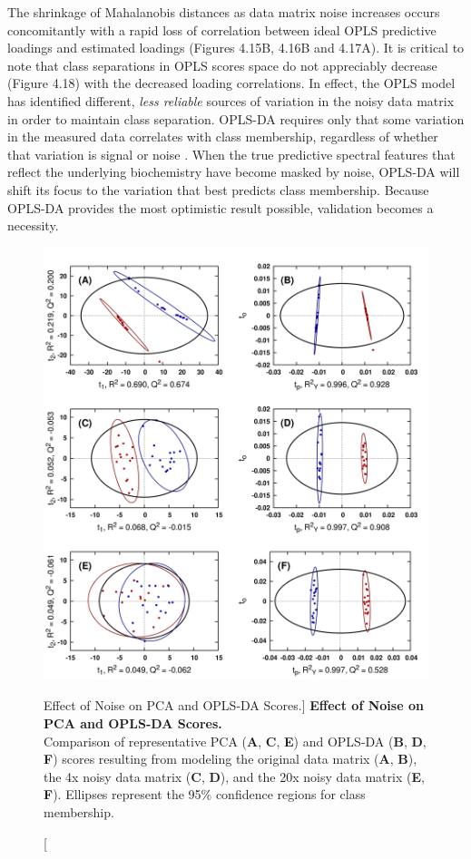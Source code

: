 \begin{doublespace}
The shrinkage of Mahalanobis distances as data matrix noise increases occurs
concomitantly with a rapid loss of correlation between ideal OPLS predictive
loadings and estimated loadings (Figures 4.15B, 4.16B and 4.17A). It is
critical to note that class separations in OPLS scores space do not appreciably
decrease (Figure 4.18) with the decreased loading correlations. In effect, the
OPLS model has identified different, \emph{less reliable} sources of variation
in the noisy data matrix in order to maintain class separation. OPLS-DA
requires only that some variation in the measured data correlates with class
membership, regardless of whether that variation is signal or noise
\cite{wold:cils2001,trygg:jchemo2002,gottfries:jchemo2008}. When the true
predictive spectral features that reflect the underlying biochemistry have
become masked by noise, OPLS-DA will shift its focus to the variation that
best predicts class membership. Because OPLS-DA provides the most optimistic
result possible, validation becomes a necessity.
\end{doublespace}

\begin{figure}[ht!]
\begin{center}
  \includegraphics[width=5in]{figs/apps/18-scores.png}
\end{center}
\caption
      [Effect of Noise on PCA and OPLS-DA Scores.]{
  {\bf Effect of Noise on PCA and OPLS-DA Scores.}
  \\
  Comparison of representative PCA ({\bf A}, {\bf C}, {\bf E}) and OPLS-DA
  ({\bf B}, {\bf D}, {\bf F}) scores resulting from modeling the original
  data matrix ({\bf A}, {\bf B}), the 4x noisy data matrix ({\bf C}, {\bf D}),
  and the 20x noisy data matrix ({\bf E}, {\bf F}). Ellipses represent
  the 95\% confidence regions for class membership.
}
\end{figure}

